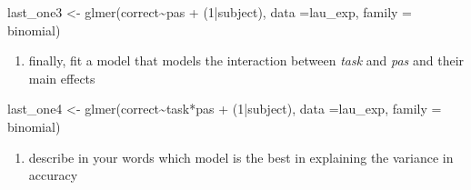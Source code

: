 \documentclass[
]{article}
\newenvironment{Shaded}{\begin{snugshade}}{\end{snugshade}}
\newcommand{\AttributeTok}[1]{\textcolor[rgb]{0.77,0.63,0.00}{#1}}
\newcommand{\DecValTok}[1]{\textcolor[rgb]{0.00,0.00,0.81}{#1}}
\newcommand{\FunctionTok}[1]{\textcolor[rgb]{0.00,0.00,0.00}{#1}}
\newcommand{\NormalTok}[1]{#1}
\newcommand{\OtherTok}[1]{\textcolor[rgb]{0.56,0.35,0.01}{#1}}
\newcommand{\SpecialCharTok}[1]{\textcolor[rgb]{0.00,0.00,0.00}{#1}}
\newcommand{\StringTok}[1]{\textcolor[rgb]{0.31,0.60,0.02}{#1}}
\providecommand{\tightlist}{%
  \setlength{\itemsep}{0pt}\setlength{\parskip}{0pt}}
\begin{document}
\begin{Shaded}
\begin{Highlighting}[]
\NormalTok{last\_one3 }\OtherTok{\textless{}{-}} \FunctionTok{glmer}\NormalTok{(correct}\SpecialCharTok{\textasciitilde{}}\NormalTok{pas }\SpecialCharTok{+}\NormalTok{ (}\DecValTok{1}\SpecialCharTok{|}\NormalTok{subject), }\AttributeTok{data =}\NormalTok{lau\_exp, }\AttributeTok{family =} \StringTok{\textquotesingle{}binomial\textquotesingle{}}\NormalTok{)}
\end{Highlighting}
\end{Shaded}

\begin{enumerate}
\def\labelenumi{\roman{enumi}.}
\setcounter{enumi}{3}
\tightlist
\item
  finally, fit a model that models the interaction between \emph{task}
  and \emph{pas} and their main effects
\end{enumerate}

\begin{Shaded}
\begin{Highlighting}[]
\NormalTok{last\_one4 }\OtherTok{\textless{}{-}} \FunctionTok{glmer}\NormalTok{(correct}\SpecialCharTok{\textasciitilde{}}\NormalTok{task}\SpecialCharTok{*}\NormalTok{pas }\SpecialCharTok{+}\NormalTok{ (}\DecValTok{1}\SpecialCharTok{|}\NormalTok{subject), }\AttributeTok{data =}\NormalTok{lau\_exp, }\AttributeTok{family =} \StringTok{\textquotesingle{}binomial\textquotesingle{}}\NormalTok{)}
\end{Highlighting}
\end{Shaded}

\begin{enumerate}
\def\labelenumi{\alph{enumi}.}
\setcounter{enumi}{21}
\tightlist
\item
  describe in your words which model is the best in explaining the
  variance in accuracy
\end{enumerate}
\end{document}
